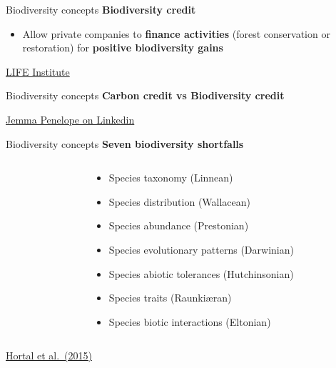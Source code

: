 \documentclass[
  ignorenonframetext,
]{beamer}
\providecommand{\tightlist}{%
  \setlength{\itemsep}{0pt}\setlength{\parskip}{0pt}}\usepackage{longtable,booktabs,array}
\begin{document}
\begin{frame}{Biodiversity concepts}
\label{biodiversity-concepts-4}
\textbf{Biodiversity credit}

\begin{itemize}
\tightlist
\item
  Allow private companies to \textbf{finance activities} (forest
  conservation or restoration) for \textbf{positive biodiversity gains}
\end{itemize}

\href{https://lifeinstituteglobal.org/creditos-life-de-biodiversidade/}{LIFE
Institute}
\end{frame}

\begin{frame}{Biodiversity concepts}
\label{biodiversity-concepts-5}
\textbf{Carbon credit vs Biodiversity credit}

\href{https://www.linkedin.com/posts/jemmapenelopemisjp_biodiversitycredits-biodiversity-carbonmarkets-activity-7128086521299009537-hX3P?utm_source=share&utm_medium=member_desktop}{Jemma
Penelope on Linkedin}
\end{frame}

\begin{frame}{Biodiversity concepts}
\label{biodiversity-concepts-6}
\textbf{Seven biodiversity shortfalls}

\begin{columns}[T]
\begin{column}{0.55\textwidth}
\end{column}

\begin{column}{0.45\textwidth}
\begin{itemize}
\tightlist
\item
  Species taxonomy (Linnean)
\item
  Species distribution (Wallacean)
\item
  Species abundance (Prestonian)
\item
  Species evolutionary patterns (Darwinian)
\item
  Species abiotic tolerances (Hutchinsonian)
\item
  Species traits (Raunkiæran)
\item
  Species biotic interactions (Eltonian)
\end{itemize}
\end{column}
\end{columns}

\href{https://doi.org/10.1146/annurev-ecolsys-112414-054400}{Hortal et
al.~(2015)}
\end{frame}
\end{document}
